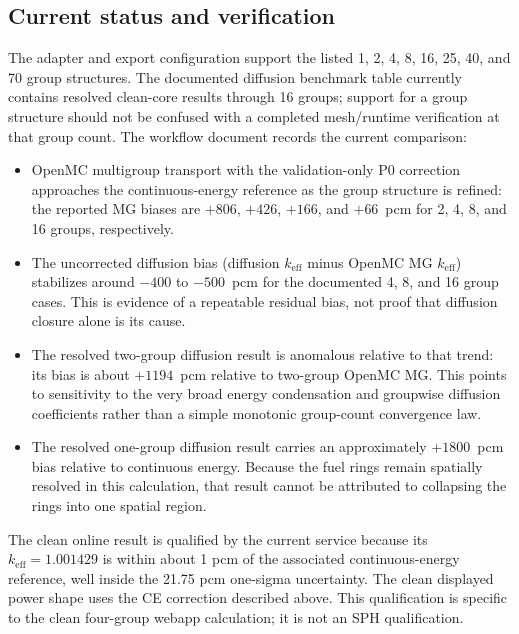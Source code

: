 \documentclass[11pt]{article}
\begin{document}
\subsection{Current status and verification}

The adapter and export configuration support the listed 1, 2, 4, 8, 16, 25,
40, and 70 group structures.  The documented diffusion benchmark table
currently contains resolved clean-core results through 16 groups; support for a
group structure should not be confused with a completed mesh/runtime
verification at that group count.  The workflow document
 records the current comparison:

\begin{itemize}
  \item OpenMC multigroup transport with the validation-only P0 correction
        approaches the continuous-energy reference as the group structure is
        refined: the reported MG biases are $+806$, $+426$, $+166$, and
        $+66$~pcm for 2, 4, 8, and 16 groups, respectively.
  \item The uncorrected diffusion bias (diffusion $k_{\mathrm{eff}}$ minus
        OpenMC MG $k_{\mathrm{eff}}$) stabilizes around $-400$ to $-500$~pcm
        for the documented 4, 8, and 16 group cases.  This is evidence of a
        repeatable residual bias, not proof that diffusion closure alone is
        its cause.
  \item The resolved two-group diffusion result is anomalous relative to that
        trend: its bias is about $+1194$~pcm relative to two-group OpenMC MG.
        This points to sensitivity to the very broad energy condensation and
        groupwise diffusion coefficients rather than a simple monotonic
        group-count convergence law.
  \item The resolved one-group diffusion result carries an approximately
        $+1800$~pcm bias relative to continuous energy.  Because the fuel rings
        remain spatially resolved in this calculation, that result cannot be
        attributed to collapsing the rings into one spatial region.
\end{itemize}

The clean online result is qualified by the current service because its
$k_{\mathrm{eff}}=1.001429$ is within about 1 pcm of the associated
continuous-energy reference, well inside the 21.75 pcm one-sigma uncertainty.
The clean displayed power shape uses the CE correction described above.  This
qualification is specific to the clean four-group webapp calculation; it is
not an SPH qualification.
\end{document}

